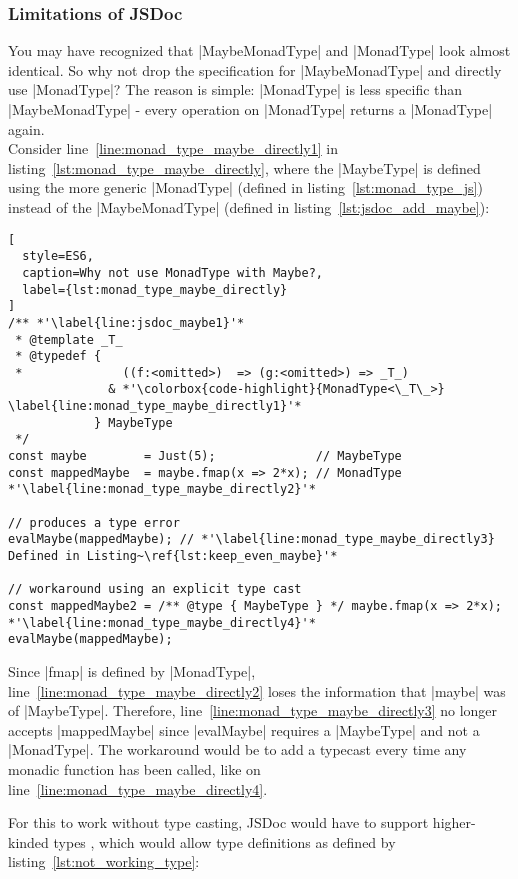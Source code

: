 \subsubsection{Limitations of JSDoc} %
\label{subsub:Limitations of JSDoc}
You may have recognized that |MaybeMonadType| and |MonadType| look almost
identical. So why not drop the specification for |MaybeMonadType| and directly
use |MonadType|? The reason is simple: |MonadType| is less specific than
|MaybeMonadType| - every operation on |MonadType| returns a |MonadType|
again.\\
Consider line~\ref{line:monad_type_maybe_directly1} in
listing~\ref{lst:monad_type_maybe_directly}, where the |MaybeType| is defined
using the more generic |MonadType| (defined in listing~\ref{lst:monad_type_js})
instead of the |MaybeMonadType| (defined in listing~\ref{lst:jsdoc_add_maybe}):

\begin{lstlisting}[
  style=ES6,
  caption=Why not use MonadType with Maybe?,
  label={lst:monad_type_maybe_directly}
]
/** *'\label{line:jsdoc_maybe1}'*
 * @template _T_
 * @typedef { 
 *              ((f:<omitted>)  => (g:<omitted>) => _T_)
              & *'\colorbox{code-highlight}{MonadType<\_T\_>}  \label{line:monad_type_maybe_directly1}'*
            } MaybeType
 */
const maybe        = Just(5);              // MaybeType
const mappedMaybe  = maybe.fmap(x => 2*x); // MonadType *'\label{line:monad_type_maybe_directly2}'*

// produces a type error
evalMaybe(mappedMaybe); // *'\label{line:monad_type_maybe_directly3} Defined in Listing~\ref{lst:keep_even_maybe}'*

// workaround using an explicit type cast
const mappedMaybe2 = /** @type { MaybeType } */ maybe.fmap(x => 2*x); *'\label{line:monad_type_maybe_directly4}'*
evalMaybe(mappedMaybe);
\end{lstlisting}

Since |fmap| is defined by |MonadType|,
line~\ref{line:monad_type_maybe_directly2} loses the information that |maybe|
was of |MaybeType|. Therefore, line~\ref{line:monad_type_maybe_directly3} no longer accepts 
|mappedMaybe| since |evalMaybe| requires a |MaybeType| and
not a |MonadType|. The workaround would be to add a typecast every time any
monadic function has been called, like on
line~\ref{line:monad_type_maybe_directly4}.

For this to work without type casting, JSDoc would have to support higher-kinded
types \cite{baeldung_higher-kinded_2020}, which would allow type definitions as
defined by listing~\ref{lst:not_working_type}:

